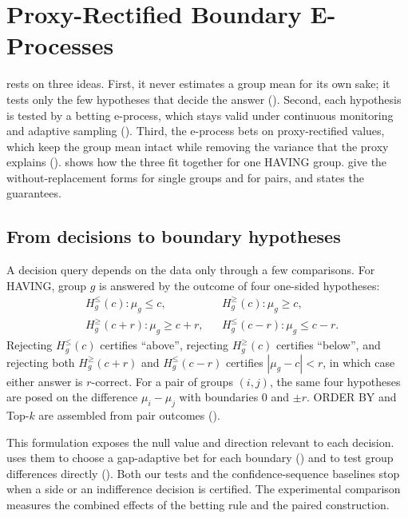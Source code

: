 \section{Proxy-Rectified Boundary E-Processes}
\label{sec:method}

\sys{} rests on three ideas.
First, it never estimates a group mean for its own sake; it tests only the few hypotheses that decide the answer ().
Second, each hypothesis is tested by a betting e-process, which stays valid under continuous monitoring and adaptive sampling ().
Third, the e-process bets on proxy-rectified values, which keep the group mean intact while removing the variance that the proxy explains ().
 shows how the three fit together for one HAVING group.
 give the without-replacement forms for single groups and for pairs, and  states the guarantees.

\subsection{From decisions to boundary hypotheses}
\label{sec:boundary}

A decision query depends on the data only through a few comparisons.
For HAVING, group $g$ is answered by the outcome of four one-sided hypotheses:
\begin{equation}
\begin{aligned}
&H^{\le}_{g}(c):\mu_g\le c, && H^{\ge}_{g}(c):\mu_g\ge c,\\
&H^{\ge}_{g}(c+r):\mu_g\ge c+r, && H^{\le}_{g}(c-r):\mu_g\le c-r.
\end{aligned}
\end{equation}
Rejecting $H^{\le}_g(c)$ certifies ``above'', rejecting $H^{\ge}_g(c)$ certifies ``below'', and rejecting both $H^{\ge}_g(c+r)$ and $H^{\le}_g(c-r)$ certifies $|\mu_g-c|<r$, in which case either answer is $r$-correct.
For a pair of groups $(i,j)$, the same four hypotheses are posed on the difference $\mu_i-\mu_j$ with boundaries $0$ and $\pm r$.
ORDER BY and Top-$k$ are assembled from pair outcomes ().

This formulation exposes the null value and direction relevant to each decision.
\sys{} uses them to choose a gap-adaptive bet for each boundary () and to test group differences directly ().
Both our tests and the confidence-sequence baselines stop when a side or an indifference decision is certified. The experimental comparison measures the combined effects of the betting rule and the paired construction.

